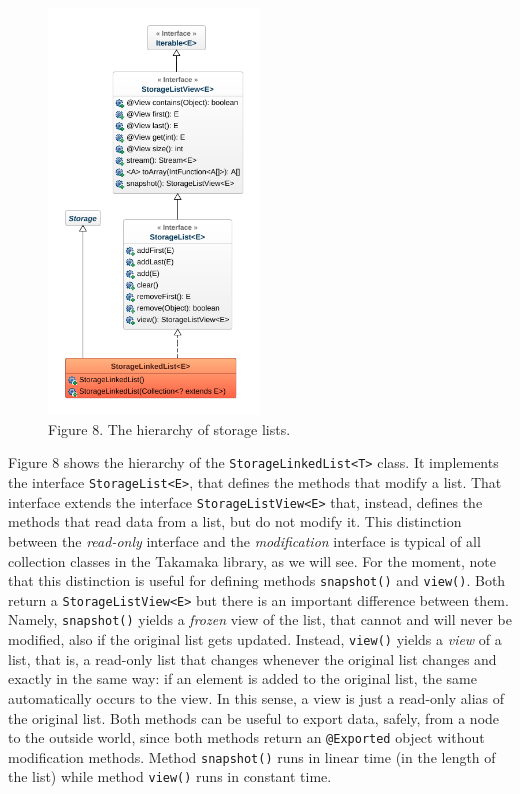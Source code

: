 \documentclass[a4paper,]{book}
\begin{document}
{\begin{figure}
\centering
\includegraphics[width=0.5\textwidth,height=\textheight]{pics/lists.png}
\caption{Figure 8. The hierarchy of storage lists.}
\end{figure}

Figure 8 shows the hierarchy of the
\texttt{StorageLinkedList\textless{}T\textgreater{}} class. It
implements the interface \texttt{StorageList\textless{}E\textgreater{}},
that defines the methods that modify a list. That interface extends the
interface \texttt{StorageListView\textless{}E\textgreater{}} that,
instead, defines the methods that read data from a list, but do not
modify it. This distinction between the \emph{read-only} interface and
the \emph{modification} interface is typical of all collection classes
in the Takamaka library, as we will see. For the moment, note that this
distinction is useful for defining methods \texttt{snapshot()} and
\texttt{view()}. Both return a
\texttt{StorageListView\textless{}E\textgreater{}} but there is an
important difference between them. Namely, \texttt{snapshot()} yields a
\emph{frozen} view of the list, that cannot and will never be modified,
also if the original list gets updated. Instead, \texttt{view()} yields
a \emph{view} of a list, that is, a read-only list that changes whenever
the original list changes and exactly in the same way: if an element is
added to the original list, the same automatically occurs to the view.
In this sense, a view is just a read-only alias of the original list.
Both methods can be useful to export data, safely, from a node to the
outside world, since both methods return an \texttt{@Exported} object
without modification methods. Method \texttt{snapshot()} runs in linear
time (in the length of the list) while method \texttt{view()} runs in
constant time.

}
\end{document}
